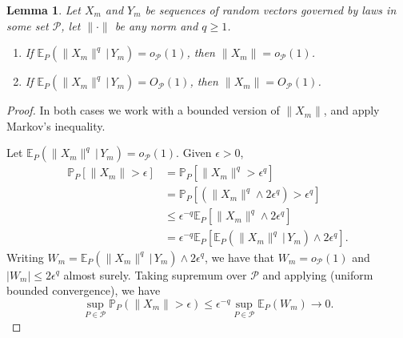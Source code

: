 \documentclass[aos]{imsart}
\renewcommand{\Pr}{\mathbb{P}}
\newcommand{\E}{\mathbb{E}}
\newcommand{\given}{\,|\,}
\newtheorem{lemma}[theorem]{Lemma}
\begin{document}
	
	\begin{lemma}
		\label{lem:uniformMarkov}
		Let $X_m$ and $Y_m$ be sequences of random vectors governed by laws in some set $\mathcal{P}$, let $\|\cdot\|$ be any norm and $q\geq 1$.
		\begin{enumerate}[label=(\alph*)]
			\item If $\E_P(\|X_m\|^q\given  Y_m) = o_{\mathcal{P}}(1)$, then $\|X_m\|=o_{\mathcal{P}}(1)$.
			\item If $\E_P(\|X_m\|^q\given  Y_m) = O_{\mathcal{P}}(1)$, then $\|X_m\|=O_{\mathcal{P}}(1)$.
		\end{enumerate}
	\end{lemma}
	\begin{proof}
		In both cases we work with a bounded version of $\|X_m\|$, and apply Markov's inequality. 
		
		Let $\E_P(\|X_m\|^q\given  Y_m) = o_{\mathcal{P}}(1)$. Given $\epsilon>0$,
		\begin{align*}
			\Pr_P[\|X_m\|>\epsilon] &= \Pr_P[\|X_m\|^q>\epsilon^q]\\
			&= \Pr_P[(\|X_m\|^q\wedge 2\epsilon^q)>\epsilon^q]\\
			&\leq \epsilon^{-q} \E_P[\|X_m\|^q\wedge 2\epsilon^q]\\
			&= \epsilon^{-q} \E_P[\E_P(\|X_m\|^q\given  Y_m) \wedge 2\epsilon^q].
		\end{align*}
		Writing $W_m =\E_P(\|X_m\|^q\given  Y_m) \wedge 2\epsilon^q$, we have that $W_m=o_\mathcal{P}(1)$ and $|W_m|\leq2\epsilon^q$ almost surely. Taking supremum over $\mathcal{P}$ and applying \citet[Supp. Lem.~25]{ShahGCM} (uniform bounded convergence), we have \begin{equation*}
			\sup_{P\in\mathcal{P}} \Pr_P(\|X_m\|>\epsilon) \leq \epsilon^{-q} \sup_{P\in\mathcal{P}} \E_P(W_m) \to 0.
		\end{equation*}
		

\end{proof}
\end{document}
